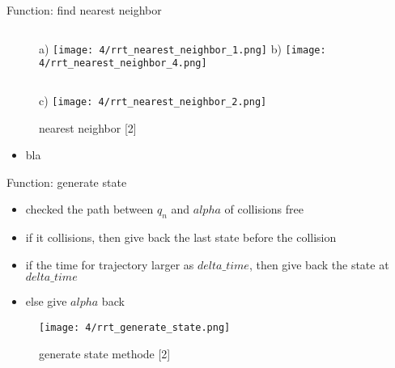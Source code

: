 \documentclass[%
  professionalfonts,%
  xcolor={%
    usenames,%
    dvipsnames,%
    svgnames,%
    table,%
    hyperref%
  }%
]{beamer}
\begin{document}
      \begin{frame}{Function: find nearest neighbor}
        \begin{figure}[h]
          \footnotesize
          \begin{columns}
            \vspace{-50pt}
            a)
            \texttt{[image: 4/rrt\_nearest\_neighbor\_1.png]}
            \vspace{-50pt}
            b)
            \texttt{[image: 4/rrt\_nearest\_neighbor\_4.png]}
          \end{columns}
          \vspace{15pt}
          \begin{columns}
            \vspace{-50pt}
            c)
            \texttt{[image: 4/rrt\_nearest\_neighbor\_2.png]}
          \end{columns}
          \caption{nearest neighbor [2]}
          \label{fig:generate state methode}
        \end{figure}
        \vspace{-35pt}
        \begin{itemize}
          \item bla
        \end{itemize}
      \end{frame}
      
      \begin{frame}{Function: generate state}
        \begin{itemize}
          \item checked the path between $q_n$ and $alpha$ of collisions free
          \item if it collisions, then give back the last state before the collision
          \item if the time for trajectory larger as $delta\_time$, then give back the state at $delta\_time$
          \item else give $alpha$ back
        \end{itemize}
        
        \begin{figure}[h]
          \texttt{[image: 4/rrt\_generate\_state.png]}
          \caption{generate state methode [2]}
          \label{fig:generate state methode}
        \end{figure}
      \end{frame}
      
\end{document}
